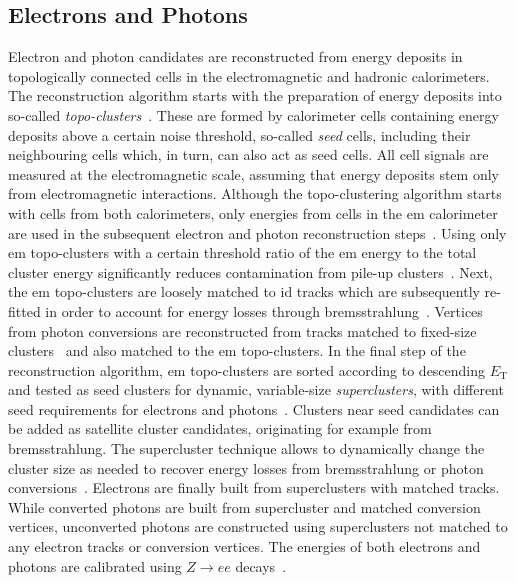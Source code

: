 \subsection{Electrons and Photons}\label{sec:reco_electrons}

Electron and photon candidates are reconstructed from energy deposits in topologically connected cells in the electromagnetic and hadronic calorimeters.
The reconstruction algorithm starts with the preparation of energy deposits into so-called \textit{topo-clusters}~\cite{PERF-2014-07}.
These are formed by calorimeter cells containing energy deposits above a certain noise threshold, so-called \textit{seed} cells, including their neighbouring cells which, in turn, can also act as seed cells.
All cell signals are measured at the electromagnetic scale, assuming that energy deposits stem only from electromagnetic interactions.
Although the topo-clustering algorithm starts with cells from both calorimeters, only energies from cells in the \gls{em} calorimeter are used in the subsequent electron and photon reconstruction steps~\cite{EGAM-2018-01}.
Using only \gls{em} topo-clusters with a certain threshold ratio of the \gls{em} energy to the total cluster energy significantly reduces contamination from pile-up clusters~\cite{EGAM-2018-01}.
Next, the \gls{em} topo-clusters are loosely matched to \gls{id} tracks which are subsequently re-fitted in order to account for energy losses through bremsstrahlung~\cite{EGAM-2018-01}.
Vertices from photon conversions are reconstructed from tracks matched to fixed-size clusters~\cite{PERF-2017-02} and also matched to the \gls{em} topo-clusters.
In the final step of the reconstruction algorithm, \gls{em} topo-clusters are sorted according to descending $E_{\mathrm{T}}$ and tested as seed clusters for dynamic, variable-size \textit{superclusters}, with different seed requirements for electrons and photons~\cite{EGAM-2018-01}.
Clusters near seed candidates can be added as satellite cluster candidates, originating for example from bremsstrahlung. The supercluster technique allows to dynamically change the cluster size as needed to recover energy losses from bremsstrahlung or photon conversions~\cite{EGAM-2018-01}.
Electrons are finally built from superclusters with matched tracks.
While converted photons are built from supercluster and matched conversion vertices, unconverted photons are constructed using superclusters not matched to any electron tracks or conversion vertices.
The energies of both electrons and photons are calibrated using $Z\rightarrow ee$ decays~\cite{EGAM-2018-01}.

